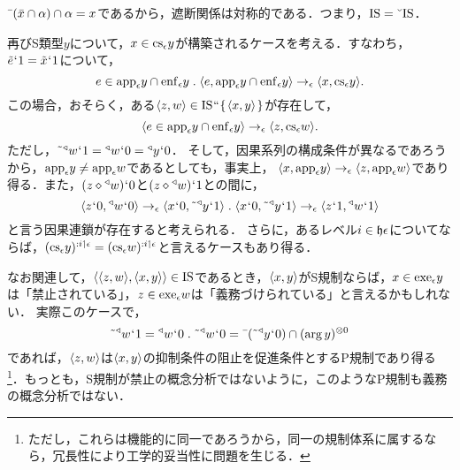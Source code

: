 \noindent $ \bar{\:\:}(\bar{x}\cap\alpha)\cap\alpha = x $であるから，遮断関係は対称的である．つまり，$ \mathrm{IS}=\breve{\:\:}\mathrm{IS} $．

再びS類型$y$について，$ x\in\mathrm{cs}_{\epsilon}y $が構築されるケースを考える．すなわち，$ \tilde{e}{\mspace{1mu}{`}\mspace{1mu}} 1 = \tilde{x}{\mspace{1mu}{`}\mspace{1mu}} 1 $について，
\[
    e\in\app{\epsilon} y\cap\enf{\epsilon}y\con{1}
    \orp{e,\app{\epsilon} y\cap\enf{\epsilon}y}\to_{\epsilon}\orp{x,\cs{\epsilon}y}.
\]
この場合，おそらく，ある$ \langle z,w \rangle\in\mathrm{IS}{\mspace{1mu}{``}\mspace{1mu}}\{\mspace{2mu}\langle x,y \rangle\mspace{2mu}\} $が存在して，
\[
    \langle e\in\mathrm{app}_{\epsilon} y\cap\mathrm{enf}_{\epsilon}y \rangle\to_{\epsilon}\langle z,\mathrm{cs}_{\epsilon}w \rangle.
\]
ただし，$ \tilde{\:\:}{^\triangleleft}w{\mspace{1mu}{`}\mspace{1mu}} 1 = {^\triangleleft}w{\mspace{1mu}{`}\mspace{1mu}} 0 = {^\triangleleft}y{\mspace{1mu}{`}\mspace{1mu}} 0 $．
そして，因果系列の構成条件が異なるであろうから，$ \mathrm{app}_{\epsilon} y \neq \mathrm{app}_{\epsilon} w $であるとしても，事実上，
$ \langle x,\mathrm{app}_{\epsilon} y \rangle\to_{\epsilon}\langle z,\mathrm{app}_{\epsilon} w \rangle $であり得る．また，$ (z\diamond{^\triangleleft}w){\mspace{1mu}{`}\mspace{1mu}} 0 $と$ (z\diamond{^\triangleleft}w){\mspace{1mu}{`}\mspace{1mu}} 1 $との間に，
\[
   \orp{z\fap 0,\trgl{w}\fap 0}\to_{\epsilon}\orp{x\fap 0,\tildel{\trgl{y}}\fap 1}\con{1}
    \orp{x\fap 0,\tildel{\trgl{y}}\fap 1}\to_{\epsilon}\orp{z\fap 1,\trgl{w}\fap 1}
\]
と言う因果連鎖が存在すると考えられる．
さらに，あるレベル$ i\in\mathfrak{h}\epsilon $についてならば，$ (\mathrm{cs}_{\epsilon}y)^{:i\mathbin{\upharpoonleft}\epsilon} = (\mathrm{cs}_{\epsilon}w)^{:i\mathbin{\upharpoonleft}\epsilon} $と言えるケースもあり得る．

なお関連して，$ \langle \langle z,w \rangle,\langle x,y \rangle \rangle\in\mathrm{IS} $であるとき，$ \langle x,y \rangle $がS規制ならば，$ x\in\mathrm{exe}_{\epsilon} y $は「禁止されている」，$ z\in\mathrm{exe}_{\epsilon} w $は「義務づけられている」と言えるかもしれない．
実際このケースで，
\[
    \tildel{\trgl{w}}\fap 1 = \trgl{w}\fap 0\con{1}
    \tildel{\trgl{w}}\fap 0 = \barl{(\tildel{\trgl{y}}\fap 0)}\cap\mser{(\arg y)}{0}
\]
であれば，$ \langle z,w \rangle $は$ \langle x,y \rangle $の抑制条件の阻止を促進条件とするP規制であり得る\footnote{
    ただし，これらは機能的に同一であろうから，同一の規制体系に属するなら，冗長性により工学的妥当性に問題を生じる．
}．もっとも，S規制が禁止の概念分析ではないように，このようなP規制も義務の概念分析ではない．

